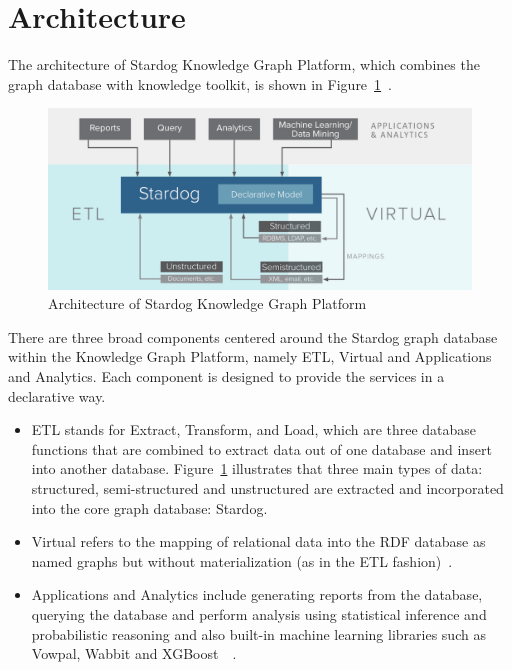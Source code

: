 \section{Architecture}
The architecture of Stardog Knowledge Graph Platform, which combines the 
graph database with knowledge toolkit, is shown in 
Figure~\ref{sa:archi}~\cite{hid-sp18-405-blog-stardog-kgraph}.
\begin{figure}[!ht]
  \centering\includegraphics[width=\columnwidth]{../images/stardog-architecture.png}
  \caption{Architecture of Stardog Knowledge Graph Platform}\label{sa:archi}
\end{figure}
There are three broad components centered around the Stardog graph 
database within the Knowledge Graph Platform, namely ETL, Virtual and 
Applications and Analytics. Each component is designed to provide 
the services in a declarative way. 
\begin{itemize}
	\item ETL stands for Extract, Transform, and Load, which are three 
	database functions that are combined to extract data out of one database 
	and insert into another database. Figure~\ref{sa:archi} illustrates that 
	three main types of data: structured, semi-structured and unstructured 
	are extracted and incorporated into the core graph database: Stardog. 
	\item Virtual refers to the mapping of relational data into the RDF database 
	as named graphs but without materialization (as in the ETL 
	fashion)~\cite{hid-sp18-405-blog-stardog-virtual}. 
	\item Applications and Analytics include generating reports from the 
	database, querying the database and perform analysis using statistical 
	inference and probabilistic reasoning and also built-in 
	machine learning libraries such as Vowpal, Wabbit and 
	XGBoost~\cite{hid-sp18-405-blog-stardog-ml}~\cite{hid-sp18-405-blog-stardog-xgboost}.
\end{itemize}

